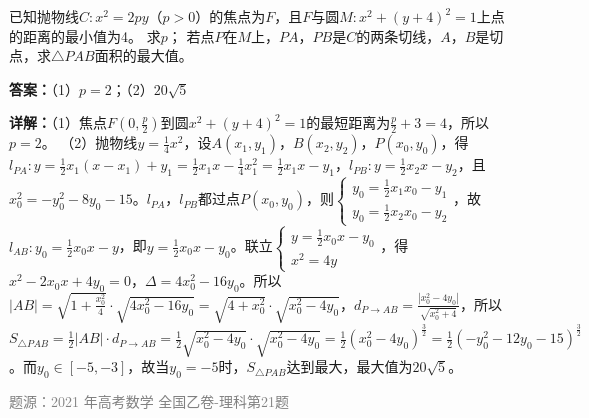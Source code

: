 \begin{question}
已知抛物线$C:x^2=2py$（$p>0$）的焦点为$F$，且$F$与圆$M:x^2+(y+4)^2=1$上点的距离的最小值为4。
求$p$；
若点$P$在$M$上，$PA$，$PB$是$C$的两条切线，$A$，$B$是切点，求$\triangle PAB$面积的最大值。
\begin{solution}
\textbf{答案：}（1）$p=2$；（2）$20\sqrt{5}$

\textbf{详解：}（1）焦点$F(0,\frac{p}{2})$到圆$x^2+(y+4)^2=1$的最短距离为$\frac{p}{2}+3=4$，所以$p=2$。
（2）抛物线$y=\frac14x^2$，设$A(x_1,y_1)$，$B(x_2,y_2)$，$P(x_0,y_0)$，得$l_{PA}: y=\frac12x_1(x-x_1)+y_1=\frac12x_1x-\frac14x_1^2=\frac12x_1x-y_1$，$l_{PB}: y=\frac12x_2x-y_2$，且$x_0^2=-y_0^2-8y_0-15$。$l_{PA}$，$l_{PB}$都过点$P(x_0,y_0)$，则$\begin{cases} y_0=\frac12x_1x_0-y_1 \\ y_0=\frac12x_2x_0-y_2 \end{cases}$，故$l_{AB}: y_0=\frac12x_0x-y$，即$y=\frac12x_0x-y_0$。联立$\begin{cases} y=\frac12x_0x-y_0 \\ x^2=4y \end{cases}$，得$x^2-2x_0x+4y_0=0$，$\Delta=4x_0^2-16y_0$。所以$|AB|=\sqrt{1+\frac{x_0^2}{4}}\cdot\sqrt{4x_0^2-16y_0}=\sqrt{4+x_0^2}\cdot\sqrt{x_0^2-4y_0}$，$d_{P\to AB}=\frac{|x_0^2-4y_0|}{\sqrt{x_0^2+4}}$，所以$S_{\triangle PAB}=\frac12|AB|\cdot d_{P\to AB}=\frac12\sqrt{x_0^2-4y_0}\cdot\sqrt{x_0^2-4y_0}=\frac12(x_0^2-4y_0)^{\frac32}=\frac12(-y_0^2-12y_0-15)^{\frac32}$。而$y_0\in[-5,-3]$，故当$y_0=-5$时，$S_{\triangle PAB}$达到最大，最大值为$20\sqrt{5}$。

\textcolor{gray}{\footnotesize 题源：2021 年高考数学 全国乙卷-理科第21题}
\end{solution}
\end{question}

